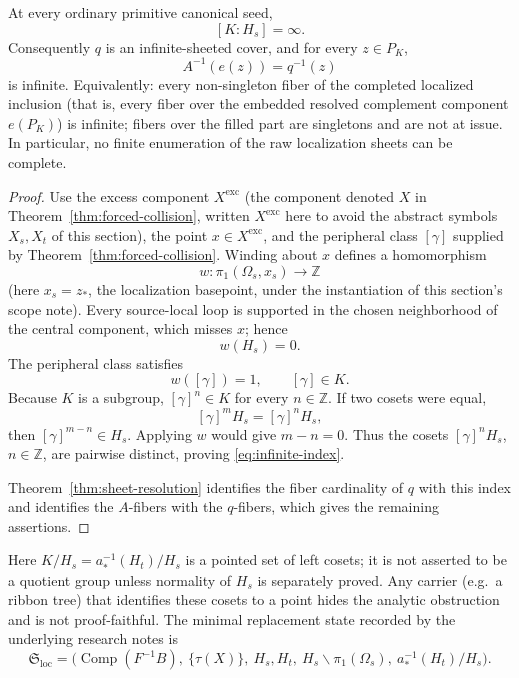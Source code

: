 \begin{corollary}\label{cor:infinite-defect}
At every ordinary primitive canonical seed,
\begin{equation}\label{eq:infinite-index}
  [K:H_s]=\infty .
\end{equation}
Consequently \( q \) is an infinite-sheeted cover, and for every \( z\in P_K \),
\[
  A^{-1}(e(z))=q^{-1}(z)
\]
is infinite.  Equivalently: every non-singleton fiber of the completed localized inclusion (that is, every fiber over the embedded resolved complement component \( e(P_K) \)) is infinite; fibers over the filled part are singletons and are not at issue.  In particular, no finite enumeration of the raw localization sheets can be complete.
\end{corollary}

\begin{proof}
Use the excess component \( X^{\mathrm{exc}} \) (the component denoted \( X \) in Theorem~\ref{thm:forced-collision}, written \( X^{\mathrm{exc}} \) here to avoid the abstract symbols \( X_s,X_t \) of this section), the point \( x\in X^{\mathrm{exc}} \), and the peripheral class \( [\gamma] \) supplied by Theorem~\ref{thm:forced-collision}.  Winding about \( x \) defines a homomorphism
\[
  w\colon\pi_1(\Omega_s,x_s)\longrightarrow\mathbb Z
\]
(here \( x_s=z_* \), the localization basepoint, under the instantiation of this section's scope note).
Every source-local loop is supported in the chosen neighborhood of the central component, which misses \( x \); hence
\[
  w(H_s)=0 .
\]
The peripheral class satisfies
\[
  w([\gamma])=1,
  \qquad
  [\gamma]\in K .
\]
Because \( K \) is a subgroup, \( [\gamma]^n\in K \) for every \( n\in\mathbb Z \).  If two cosets were equal,
\[
  [\gamma]^mH_s=[\gamma]^nH_s,
\]
then \( [\gamma]^{m-n}\in H_s \).  Applying \( w \) would give \( m-n=0 \).  Thus the cosets \( [\gamma]^nH_s \), \( n\in\mathbb Z \), are pairwise distinct, proving \eqref{eq:infinite-index}.

Theorem~\ref{thm:sheet-resolution} identifies the fiber cardinality of \( q \) with this index and identifies the \( A \)-fibers with the \( q \)-fibers, which gives the remaining assertions.
\end{proof}

\begin{remark}\label{rem:coset-set}
Here \(K/H_s=a_*^{-1}(H_t)/H_s\) is a pointed set of left cosets; it is not asserted to be a quotient group unless normality of \(H_s\) is separately proved.  Any carrier (e.g.\ a ribbon tree) that identifies these cosets to a point hides the analytic obstruction and is not proof-faithful.  The minimal replacement state recorded by the underlying research notes is
\[
 \mathfrak S_{\mathrm{loc}}=\bigl(\operatorname{Comp}(F^{-1}B),\ \{\tau(X)\},\ H_s,H_t,\ H_s\backslash\pi_1(\Omega_s),\ a_*^{-1}(H_t)/H_s\bigr).  \tag{9.1}
\]
\end{remark}